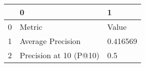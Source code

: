 \begin{tabular}{lll}
\toprule
{} &                       0 &         1 \\
\midrule
0 &                  Metric &     Value \\
1 &       Average Precision &  0.416569 \\
2 &  Precision at 10 (P@10) &       0.5 \\
\bottomrule
\end{tabular}
